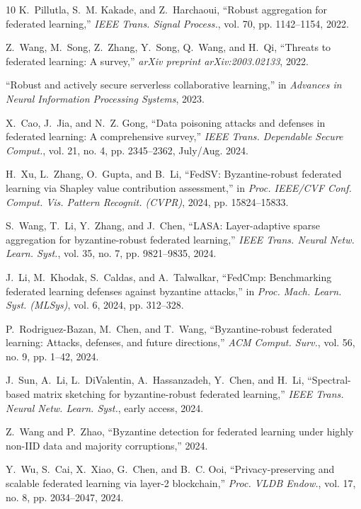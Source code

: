 \documentclass[12pt,a4paper,onecolumn]{article}
\begin{document}
\begin{thebibliography}{10}
K.~Pillutla, S.~M. Kakade, and Z.~Harchaoui,
``Robust aggregation for federated learning,''
\emph{IEEE Trans. Signal Process.}, vol. 70, pp. 1142--1154, 2022.

Z.~Wang, M.~Song, Z.~Zhang, Y.~Song, Q.~Wang, and H.~Qi,
``Threats to federated learning: A survey,''
\emph{arXiv preprint arXiv:2003.02133}, 2022.

``Robust and actively secure serverless collaborative learning,''
in \emph{Advances in Neural Information Processing Systems}, 2023.

X.~Cao, J.~Jia, and N.~Z. Gong,
``Data poisoning attacks and defenses in federated learning: A comprehensive survey,''
\emph{IEEE Trans. Dependable Secure Comput.}, vol. 21, no. 4, pp. 2345--2362, July/Aug. 2024.

H.~Xu, L.~Zhang, O.~Gupta, and B.~Li,
``FedSV: Byzantine-robust federated learning via Shapley value contribution assessment,''
in \emph{Proc. IEEE/CVF Conf. Comput. Vis. Pattern Recognit. (CVPR)}, 2024, pp. 15824--15833.

S.~Wang, T.~Li, Y.~Zhang, and J.~Chen,
``LASA: Layer-adaptive sparse aggregation for byzantine-robust federated learning,''
\emph{IEEE Trans. Neural Netw. Learn. Syst.}, vol. 35, no. 7, pp. 9821--9835, 2024.

J.~Li, M.~Khodak, S.~Caldas, and A.~Talwalkar,
``FedCmp: Benchmarking federated learning defenses against byzantine attacks,''
in \emph{Proc. Mach. Learn. Syst. (MLSys)}, vol. 6, 2024, pp. 312--328.

P.~Rodriguez-Bazan, M.~Chen, and T.~Wang,
``Byzantine-robust federated learning: Attacks, defenses, and future directions,''
\emph{ACM Comput. Surv.}, vol. 56, no. 9, pp. 1--42, 2024.

J.~Sun, A.~Li, L.~DiValentin, A.~Hassanzadeh, Y.~Chen, and H.~Li,
``Spectral-based matrix sketching for byzantine-robust federated learning,''
\emph{IEEE Trans. Neural Netw. Learn. Syst.}, early access, 2024.

Z.~Wang and P.~Zhao,
``Byzantine detection for federated learning under highly non-IID data and majority corruptions,'' 2024.

Y.~Wu, S.~Cai, X.~Xiao, G.~Chen, and B.~C. Ooi,
``Privacy-preserving and scalable federated learning via layer-2 blockchain,''
\emph{Proc. VLDB Endow.}, vol. 17, no. 8, pp. 2034--2047, 2024.


\end{thebibliography}
\end{document}
